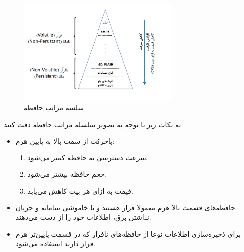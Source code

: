 \begin{flushright}
    \begin{figure}[H]
        \centering
        \includegraphics[width=0.7\textwidth]{source/memory-hierarchy}
        \caption{سلسه مراتب حافظه}
        \label{fig:memory-hierarchy}
    \end{figure}

    به نکات زیر با توجه به تصویر سلسله مراتب حافظه دقت کنید.
    \begin{itemize}
        \item باحرکت از سمت بالا به پایین هرم:
        \begin{enumerate}
            \item سرعت دسترسی به حافظه کمتر می‌شود.
            \item حجم حافظه بیشتر می‌شود.
            \item قیمت به ازای هر بیت کاهش می‌یابد.
        \end{enumerate}
        \item حافظه‌های قسمت بالا هرم معمولا فرار هستند و با خاموشی سامانه و جریان نداشتن برق، اطلاعات خود را از دست می‌دهند.
        \item برای ذخیره‌سازی اطلاعات نوعا از حافظه‌های نافرار که در قسمت پایین‌تر هرم قرار دارند استفاده می‌شود.
    \end{itemize}


\end{flushright}